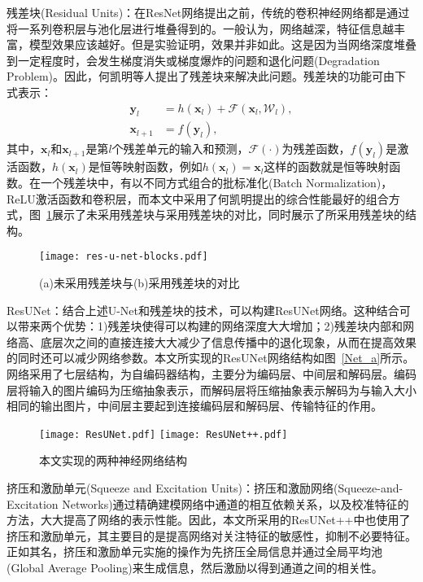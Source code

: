 残差块(Residual Units)：在ResNet网络提出之前，传统的卷积神经网络都是通过将一系列卷积层与池化层进行堆叠得到的。一般认为，网络越深，特征信息越丰富，模型效果应该越好。但是实验证明，效果并非如此。这是因为当网络深度堆叠到一定程度时，会发生梯度消失或梯度爆炸的问题和退化问题(Degradation Problem)\cite{he2016deep}。因此，何凯明等人提出了残差块来解决此问题。残差块的功能可由下式表示：
\begin{equation*}
    \begin{split}
    \mathbf{y}_{l}\ \ \ & = h(\mathbf{x}_{l})+\mathcal{F}(\mathbf{x}_{l}, \mathcal{W}_{l}), \\
    \mathbf{x}_{l+1} & = f(\mathbf{y}_{l}),
    \end{split}
\end{equation*}
其中，$\mathbf{x}_{l}$和$\mathbf{x}_{l+1}$是第$l$个残差单元的输入和预测，$\mathcal{F}(\cdot)$为残差函数，$f(\mathbf{y}_l)$是激活函数，$h(\mathbf{x}_{l})$是恒等映射函数，例如$h(\mathbf{x}_{l}) = \mathbf{x}_{l}$这样的函数就是恒等映射函数。在一个残差块中，有以不同方式组合的批标准化(Batch Normalization)，ReLU激活函数和卷积层，而本文中采用了何凯明\cite{he2016deep}提出的综合性能最好的组合方式，图~\ref{residual_compare}展示了未采用残差块与采用残差块的对比，同时展示了所采用残差块的结构。
\begin{figure}
    \centering
    \texttt{[image: res-u-net-blocks.pdf]}
    \caption{(a)未采用残差块与(b)采用残差块的对比}
    \label{residual_compare}
\end{figure}

ResUNet：结合上述U-Net和残差块的技术，可以构建ResUNet网络\cite{2017Road}。这种结合可以带来两个优势：1)残差块使得可以构建的网络深度大大增加；2)残差块内部和网络高、底层次之间的直接连接大大减少了信息传播中的退化现象，从而在提高效果的同时还可以减少网络参数。本文所实现的ResUNet网络结构如图~\ref{Net_a}所示。网络采用了七层结构，为自编码器结构，主要分为编码层、中间层和解码层。编码层将输入的图片编码为压缩抽象表示，而解码层将压缩抽象表示解码为与输入大小相同的输出图片，中间层主要起到连接编码层和解码层、传输特征的作用。
\begin{figure}
    \centering
      {\texttt{[image: ResUNet.pdf]}}
      {\texttt{[image: ResUNet++.pdf]}}
    \caption{本文实现的两种神经网络结构}
    \label{Net}
\end{figure}

挤压和激励单元(Squeeze and Excitation Units)：挤压和激励网络(Squeeze-and-Excitation Networks)\cite{2017Squeeze}通过精确建模网络中通道的相互依赖关系，以及校准特征的方法，大大提高了网络的表示性能。因此，本文所采用的ResUNet++中也使用了挤压和激励单元，其主要目的是提高网络对关注特征的敏感性，抑制不必要特征。正如其名，挤压和激励单元实施的操作为先挤压全局信息并通过全局平均池(Global Average Pooling)来生成信息，然后激励以得到通道之间的相关性。


